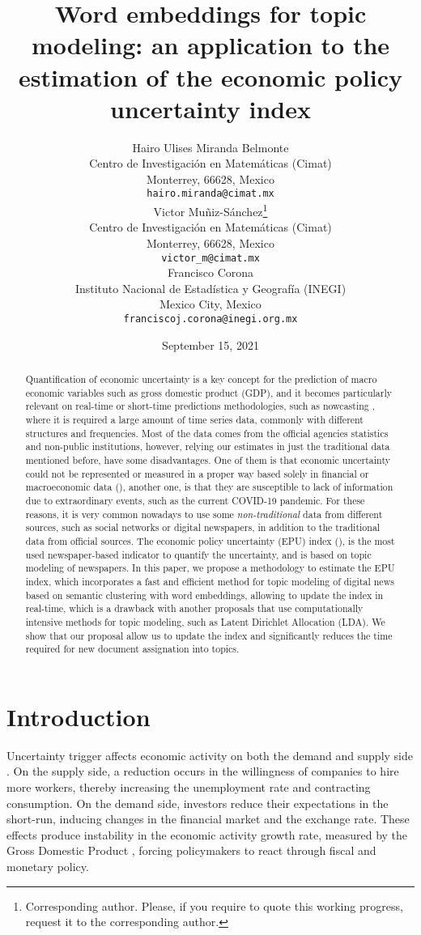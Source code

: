 \documentclass{article}
\title{Word embeddings for topic modeling: an application to the estimation of the economic policy uncertainty index}
\date{September 15, 2021}	%
\author{ Hairo Ulises Miranda Belmonte \\
	Centro de Investigación en Matemáticas (Cimat) \\
	Monterrey, 66628, Mexico\\
	\texttt{hairo.miranda@cimat.mx} \\
	\And
	Victor Muñiz-Sánchez\thanks{Corresponding author. Please, if you require to quote this working progress, request it to the corresponding author. } \\
	Centro de Investigación en Matemáticas (Cimat) \\
	Monterrey, 66628, Mexico\\
	\texttt{victor\_m@cimat.mx} \\
	
	\And
	Francisco Corona \\
	Instituto Nacional de Estadística y Geografía (INEGI) \\
	Mexico City, Mexico\\
	\texttt{franciscoj.corona@inegi.org.mx}
}
\begin{document}
\maketitle

\begin{abstract}
Quantification of economic uncertainty is a key concept for the prediction of macro economic variables such as gross domestic product (GDP), and it becomes particularly relevant on real-time or short-time predictions methodologies, such as nowcasting \citep{banbura2010, banbura2013}, where it is required a large amount of time series data, commonly with different structures and frequencies. Most of the data comes from the official agencies statistics and non-public institutions, however, relying our estimates in just the traditional data mentioned before, have some disadvantages. One of them is that economic uncertainty could not be represented or measured in a proper way based solely in financial or macroeconomic data (\cite{Baker2016}), another one, is that they are susceptible to lack of information due to extraordinary events, such as the current COVID-19 pandemic. For these reasons, it is very common nowadays to use some \emph{non-traditional} data from different sources, such as social networks or digital newspapers, in addition to the traditional data from official sources. The economic policy uncertainty (EPU) index (\cite{Baker2016}), is the most used newspaper-based indicator to quantify the uncertainty, and is based on topic modeling of newspapers. In this paper, we propose a methodology to estimate the EPU index, which incorporates a fast and efficient method for topic modeling of digital news based on semantic clustering with word embeddings, allowing to update the index in real-time, which is a drawback with another proposals that use computationally intensive methods for topic modeling, such as Latent Dirichlet Allocation (LDA). We show that our proposal allow us to update the index and significantly reduces the time required for new document assignation into topics.
\end{abstract}




\section{Introduction}
Uncertainty trigger affects economic activity  on both the demand and supply side \citep{stock2012}. On the supply side, a reduction occurs in the willingness of companies to hire more workers,  thereby increasing the unemployment rate and contracting consumption. On the demand side, investors reduce their expectations in the short-run, inducing changes in the financial market and the exchange rate. These effects produce instability in the economic activity growth rate, measured by the Gross Domestic Product \citep{Baker2020}, forcing policymakers to react through fiscal and monetary policy.
\end{document}
